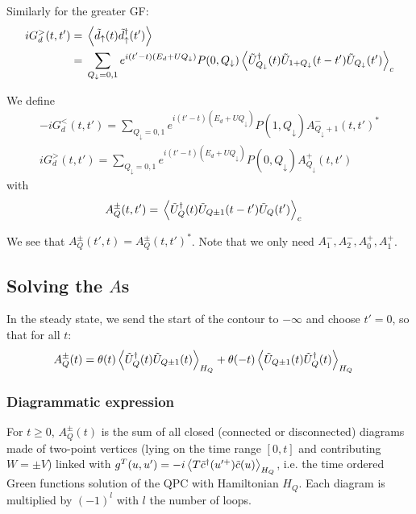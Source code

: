 \documentclass[12pt]{article}
\newcommand\up{\uparrow}
\newcommand\dn{\downarrow}
\begin{document}
Similarly for the greater \ac{GF}:
\begin{align}
	i G^>_d(t, t') ={}& \expval{\tilde d_\up(t) \tilde d_\up^\dagger(t') }
	\\
	={}& \sum_{Q_\dn = 0,1} e^{i(t' - t) (E_d + U Q_\dn)} P(0, Q_\dn)
	\expval{ \tilde U_{Q_\dn}^\dag(t) \tilde U_{1 + Q_\dn}(t - t') \tilde U_{Q_\dn}(t')}_c
\end{align}

We define
\begin{gather}
	-i G^<_d(t, t') = \sum_{Q_\dn=0,1} e^{i(t' - t) (E_d + U Q_\dn)} P(1, Q_\dn) A^-_{Q_\dn + 1}(t, t')^*
	\\
	i G^>_d(t, t') = \sum_{Q_\dn=0,1} e^{i(t' - t) (E_d + U Q_\dn)} P(0, Q_\dn) A^+_{Q_\dn}(t, t')
\end{gather}
with
\begin{align}
	A^{\pm}_{Q}(t, t') ={}& \expval{ \tilde U_{Q}^\dag(t) \tilde U_{Q\pm1}(t - t') \tilde U_{Q}(t')}_c
\end{align}

We see that $A^{\pm}_Q(t', t) = A^{\pm}_Q(t, t')^*$.
Note that we only need $A_1^-, A_2^-, A_0^+, A_1^+$.


\subsection{Solving the $A$s}

In the steady state, we send the start of the contour to $-\infty$ and choose $t' = 0$, so that for all $t$:
\begin{align}
	A^{\pm}_{Q}(t) ={}& \theta(t)\expval{ \tilde U_{Q}^\dag(t) \tilde U_{Q\pm1}(t)}_{H_{Q}} + \theta(-t)\expval{ \tilde U_{Q\pm1}(t) \tilde U_{Q}^\dag(t)}_{H_{Q}}
\end{align}

\subsubsection{Diagrammatic expression}

For $t \ge 0$, $A^{\pm}_Q(t)$ is the sum of all closed (connected or disconnected) diagrams made of two-point vertices (lying on the time range $[0, t]$ and contributing $W=\pm V$) linked with $g^T(u, u') = -i\expval{T \tilde c^\dag(u'^+) \tilde c(u)}_{H_Q}$, i.e. the time ordered Green functions solution of the QPC with Hamiltonian $H_Q$. Each diagram is multiplied by $(-1)^{l}$ with $l$ the number of loops.
\end{document}
